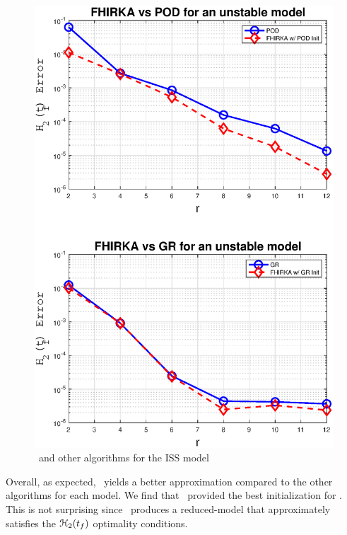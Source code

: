 \documentclass[twocolumn]{autart}
\begin{document}
  \begin{figure}%
 \centering
   \includegraphics [scale=0.5]{fig3u}
      \caption{\FH \ and other algorithms for the ISS model \label{fig:uns}}
 \end{figure}
 
%

 
 
  Overall,  as expected, \FH \ yields a better approximation compared to the other algorithms for each model. 
 We find that \goyal\  provided the best initialization for \FH. This is not surprising since \goyal\ produces a reduced-model that approximately satisfies the $\EuScript{H}_2(t_f)$ optimality conditions. 
 
\end{document}
